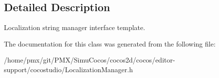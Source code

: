\subsection{Detailed Description}
Localization string manager interface template. 

The documentation for this class was generated from the following file\+:\begin{DoxyCompactItemize}
\item 
/home/pmx/git/\+P\+M\+X/\+Simu\+Cocos/cocos2d/cocos/editor-\/support/cocostudio/Localization\+Manager.\+h\end{DoxyCompactItemize}
